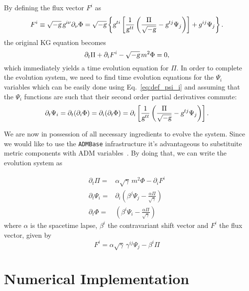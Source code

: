 By defining the flux vector $F^i$ as
%
\begin{equation}
  F^i \equiv \sqrt{-\textsl{g}}\,\textsl{g}^{i \nu}\partial_\nu\Phi = \sqrt{-\textsl{g}}\left\{ \textsl{g}^{ti} \left[ \frac{1}{\textsl{g}^{tt}}\left( \frac{\Pi}{\sqrt{-\textsl{g}}} - \textsl{g}^{tj}\Psi_j \right) \right] + g^{ij}\Psi_j \right\}.
\end{equation}
%
the original KG equation becomes
%
\begin{equation}
  \partial_t\Pi + \partial_iF^i - \sqrt{-\textsl{g}}\, m^2 \Phi = 0,
\end{equation}
%
which immediately yields a time evolution equation for $\Pi$. In order to complete the evolution system, we need to find time evolution equations for the $\Psi_i$ variables which can be easily done using Eq.~\eqref{eq:def_psi_i} and assuming that the $\Psi_i$ functions are such that their second order partial derivatives commute:
%
\begin{equation}
  \partial_t\Psi_i = \partial_t(\partial_i\Phi) = \partial_i(\partial_t\Phi) = \partial_i \left[  \frac{1}{\textsl{g}^{tt}}\left( \frac{\Pi}{\sqrt{-\textsl{g}}} - \textsl{g}^{tj}\Psi_j \right) \right].
\end{equation}

We are now in possession of all necessary ingredients to evolve the system. Since we would like to use the \texttt{ADMBase} infrastructure it's advantageous to substituite metric components with ADM variables~\cite{baumgarte2010}. By doing that, we can write the evolution system as

\begin{align}
  \partial_t\Pi    = &  \alpha \sqrt{\gamma}\,m^2\Phi - \partial_iF^i\\
  \partial_t\Psi_i = & \partial_i\left( \beta^j\Psi_j - \frac{\alpha \Pi}{\sqrt{\gamma}} \right)\\
  \partial_t\Phi   = & \left( \beta^i\Psi_i - \frac{\alpha \Pi}{\sqrt{\gamma}} \right)
\end{align}
%
where $\alpha$ is the spacetime lapse, $\beta^i$ the contravariant shift vector and $F^i$ the flux vector, given by
%
\begin{equation}
  F^i = \alpha \sqrt{\gamma}\, \gamma^{ij}\Psi_j - \beta^i \Pi
\end{equation}

\section{Numerical Implementation}

